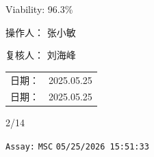 \documentclass[UTF8,10pt,a4paper,fontset=fandol]{ctexart}
\newcommand{\fieldvalue}[1]{#1}
\newcommand{\handwritten}[1]{#1}
\begin{document}
\medskip

Viability:
\fieldvalue{96.3\%}

\bigskip

\begin{center}
\setlength{\fboxsep}{8pt}
\hspace{0.08\textwidth}

\vspace{1.0cm}

\hspace{0.08\textwidth}
\end{center}

\vfill

\noindent
操作人：
\fieldvalue{\handwritten{张小敏}}

\noindent
复核人：
\fieldvalue{\handwritten{刘海峰}}

\hfill
\begin{tabular}{@{}ll@{}}
日期：
&
\fieldvalue{\handwritten{2025.05.25}}
\\
日期：
&
\fieldvalue{\handwritten{2025.05.25}}
\end{tabular}

\begin{flushright}
\handwritten{2/14}
\end{flushright}

\newpage

\noindent\texttt{Assay:}
\fieldvalue{\texttt{MSC}}
\hfill
\fieldvalue{\texttt{05/25/2026 15:51:33}}

\medskip
\end{document}
